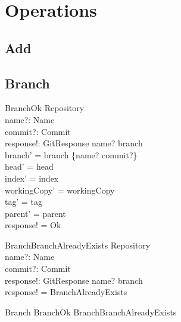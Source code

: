 \section{Operations}

\subsection{Add}


\subsection{Branch}

\begin{schema}{BranchOk}
	\Delta Repository \\
	name?: Name \\
	commit?: Commit \\
	response!: GitResponse
\where
	name? \notin \dom branch \\
	branch' = branch \cup \{name? \mapsto commit?\} \\
	head' = head \\
	index' = index \\
	workingCopy' = workingCopy \\
	tag' = tag \\
	parent' = parent \\
	response! = Ok
\end{schema}

\begin{schema}{BranchBranchAlreadyExists}
	\Xi Repository \\
	name?: Name \\
	commit?: Commit \\
	response!: GitResponse
\where
	name? \in \dom branch \\
  response! = BranchAlreadyExists
\end{schema}

\begin{zed}
	Branch  BranchOk \lor BranchBranchAlreadyExists
\end{zed}

